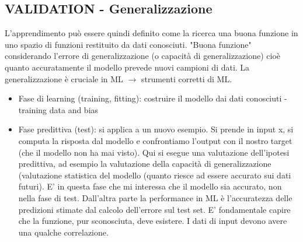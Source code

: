 \documentclass{article}
\begin{document}
\subsection{VALIDATION - Generalizzazione}
L'apprendimento può essere quindi definito come la ricerca una buona funzione in uno spazio di funzioni restituito da dati conosciuti. "Buona funzione" considerando l'errore di generalizzazione (o capacità di generalizzazione) cioè quanto accuratamente il modello prevede nuovi campioni di dati. La generalizzazione è cruciale in ML $\rightarrow$ strumenti corretti di ML.
\begin{itemize}
    \item Fase di learning (training, fitting): costruire il modello dai dati conosciuti - training data and bias
    \item Fase predittiva (test): si applica a un nuovo esempio. Si prende in input x, si computa la risposta dal modello e confrontiamo l'output con il nostro target (che il modello non ha mai visto). Qui si esegue una valutazione dell'ipotesi predittiva, ad esempio la valutazione della capacità di generalizzazione (valutazione statistica del modello (quanto riesce ad essere accurato sui dati futuri). E' in questa fase che mi interessa che il modello sia accurato, non nella fase di test. Dall'altra parte la performance in ML è l'accuratezza delle predizioni stimate dal calcolo dell'errore sul test set. E' fondamentale capire che la funzione, pur sconosciuta, deve esistere. I dati di input devono avere una qualche correlazione.
\end{itemize}

%
%
\end{document}
